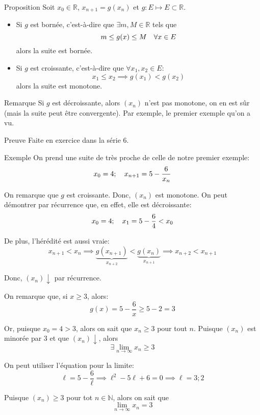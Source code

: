 \documentclass[a4paper]{article}
\begin{document}
\begin{parag}{Proposition}
    Soit $x_0 \in \mathbb{R}$, $x_{n+1} = g\left(x_n\right)$ et $g : E \mapsto E \subset \mathbb{R}$.

    \begin{itemize}
        \item Si $g$ est bornée, c'est-à-dire que $\exists m, M \in \mathbb{R}$ tels que
            \[m \leq g\left(x\right) \leq M \mathspace \forall x \in E\]
            alors la suite est bornée.

        \item Si $g$ est croissante, c'est-à-dire que $\forall x_1, x_2 \in E$:
            \[x_1 \leq x_2 \implies g\left(x_1\right) < g\left(x_2\right)\]
            alors la suite est monotone.
    \end{itemize}

    \begin{subparag}{Remarque}
        Si $g$ est décroissante, alors $\left(x_n\right)$ n'est pas monotone, on en est sûr (mais la suite peut être convergente). Par exemple, le premier exemple qu'on a vu.
    \end{subparag}

    \begin{subparag}{Preuve}
        Faite en exercice dans la série 6.
    \end{subparag}

\end{parag}

\begin{parag}{Exemple}
    On prend une suite de très proche de celle de notre premier exemple:
    \[x_0 = 4; \quad x_{n+1} = 5 - \frac{6}{x_n}\]

    On remarque que $g$ est croissante. Donc, $\left(x_n\right)$ est monotone. On peut démontrer par récurrence que, en effet, elle est décroissante:
    \[x_0 = 4; \quad x_1 = 5 - \frac{6}{4} < x_0\]

    De plus, l'hérédité est aussi vraie:
    \[x_{n+1} < x_n \implies \underbrace{ g\left(x_{n+1}\right)}_{x_{n+2}} < \underbrace{g\left(x_n\right)}_{x_{n+1}} \implies x_{n+2} < x_{n+1}\]

    Donc, $\left(x_n\right)\downarrow$ par récurrence.

    On remarque que, si $x \geq 3$, alors:
    \[g\left(x\right) = 5 - \frac{6}{x} \geq 5 - 2 = 3\]

    Or, puisque $x_0 = 4 > 3$, alors on sait que $x_n \geq 3$ pour tout $n$. Puisque $\left(x_n\right)$ est minorée par $3$ et que $\left(x_n\right)\downarrow$, alors
    \[\exists \lim_{n \to \infty} x_n \geq 3\]

    On peut utiliser l'équation pour la limite:
    \[\ell = 5 - \frac{6}{\ell} \implies \ell^2 - 5\ell + 6 = 0 \implies \ell = 3; 2\]

    Puisque $\left(x_n\right) \geq 3$ pour tot $n \in \mathbb{N}$, alors on sait que
    \[\lim_{n \to \infty} x_n = 3\]

\end{parag}
\end{document}
